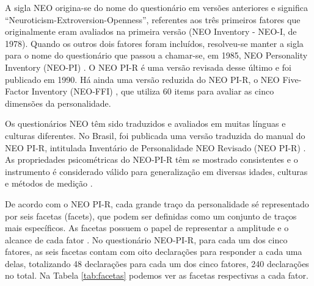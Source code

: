 A sigla NEO origina-se do nome do questionário em versões anteriores e significa ``Neuroticism-Extroversion-Openness'', referentes aos três primeiros fatores que originalmente eram avaliados na primeira versão (NEO Inventory - NEO-I, de 1978). Quando os outros dois fatores foram incluídos, resolveu-se manter a sigla para o nome do questionário que passou a chamar-se, em 1985, NEO Personality Inventory (NEO-PI) \cite{costa:85}. O NEO PI-R é uma versão revisada desse último e foi publicado em 1990. Há ainda uma versão reduzida do NEO PI-R, o NEO Five-Factor Inventory (NEO-FFI) \cite{costa:92b}, que utiliza 60 items para avaliar as cinco dimensões da personalidade.

Os questionários NEO têm sido traduzidos e avaliados em muitas línguas e culturas diferentes. No Brasil, foi publicada uma versão traduzida do manual do NEO PI-R, intitulada Inventário de Personalidade NEO Revisado (NEO PI-R) \cite{flores:07}. As propriedades psicométricas do NEO-PI-R têm se mostrado consistentes e o instrumento é considerado válido para generalização em diversas idades, culturas e métodos de medição \cite{mccrae:11}.

De acordo com o NEO PI-R, cada grande traço da personalidade sé representado por seis facetas (facets), que podem ser definidas como um conjunto de traços mais específicos. As facetas possuem o papel de representar a amplitude e o alcance de cada fator \cite{mccrae:06}. No questionário NEO-PI-R, para cada um dos cinco fatores, as seis facetas contam com oito declarações para responder a cada uma delas, totalizando 48 declarações para cada um dos cinco fatores, 240 declarações no total. Na Tabela \ref{tab:facetas} podemos ver as facetas respectivas a cada fator.

